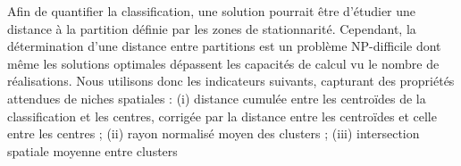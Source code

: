 \documentclass[11pt]{article}
\begin{document}
Afin de quantifier la classification, une solution pourrait être d'étudier une distance à la partition définie par les zones de stationnarité. Cependant, la détermination d'une distance entre partitions est un problème NP-difficile \citep{day1981complexity} dont même les solutions optimales \citep{porumbel2011efficient} dépassent les capacités de calcul vu le nombre de réalisations. Nous utilisons donc les indicateurs suivants, capturant des propriétés attendues de niches spatiales : (i) distance cumulée entre les centroïdes de la classification et les centres, corrigée par la distance entre les centroïdes et celle entre les centres %
 ; (ii) rayon normalisé moyen des clusters ; (iii) intersection spatiale moyenne entre clusters
\end{document}
